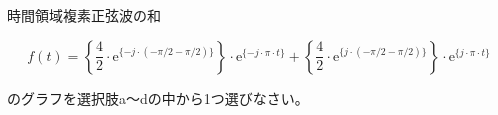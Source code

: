 時間領域複素正弦波の和

\[
f(t) =
\left \{ \frac{4}{2} \cdot \textrm{e}^{\{-j \cdot (-\pi/2 - \pi/2) \}} \right \} \cdot \textrm{e}^{\{-j \cdot \pi \cdot t \}} +  
\left \{ \frac{4}{2} \cdot \textrm{e}^{\{ j \cdot (-\pi/2 - \pi/2) \}} \right \} \cdot \textrm{e}^{\{j \cdot \pi \cdot t \}}
\]

\bigskip
\noindent  のグラフを選択肢a〜dの中から1つ選びなさい。
